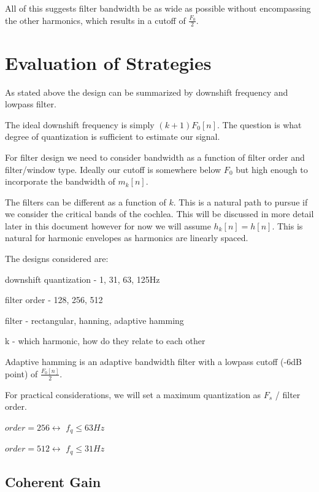 \documentclass [11pt, proquest] {uwthesis}[2015/03/03]
\begin{document}
All of this suggests filter bandwidth be as wide as possible without encompassing the other harmonics, which results in a cutoff of $\frac{F_0}{2}$.



\section{Evaluation of Strategies}

As stated above the design can be summarized by downshift frequency and lowpass filter.

The ideal downshift frequency is simply $(k+1)F_0[n]$.  The question is what degree of quantization is sufficient to estimate our signal.

For filter design we need to consider bandwidth as a function of filter order and filter/window type.  Ideally our cutoff is somewhere below $F_0$ but high enough to incorporate the bandwidth of $m_k[n]$.

The filters can be different as a function of $k$.  This is a natural path to pursue if we consider the critical bands of the cochlea.  This will be discussed in more detail later in this document however for now we will assume $h_k[n] = h[n]$.  This is natural for harmonic envelopes as harmonics are linearly spaced.

The designs considered are:

downshift quantization - 1, 31, 63, 125Hz

filter order - 128, 256, 512

filter - rectangular, hanning, adaptive hamming

k - which harmonic, how do they relate to each other

Adaptive hamming is an adaptive bandwidth filter with a lowpass cutoff (-6dB point) of $\frac{F_0[n]}{2}$.

For practical considerations, we will set a maximum quantization as $F_s$ /  filter order.

$order = 256 \longleftrightarrow$ $f_q \leq 63Hz$

$order = 512 \longleftrightarrow$ $f_q \leq 31Hz$

\subsection{Coherent Gain}
\end{document}
